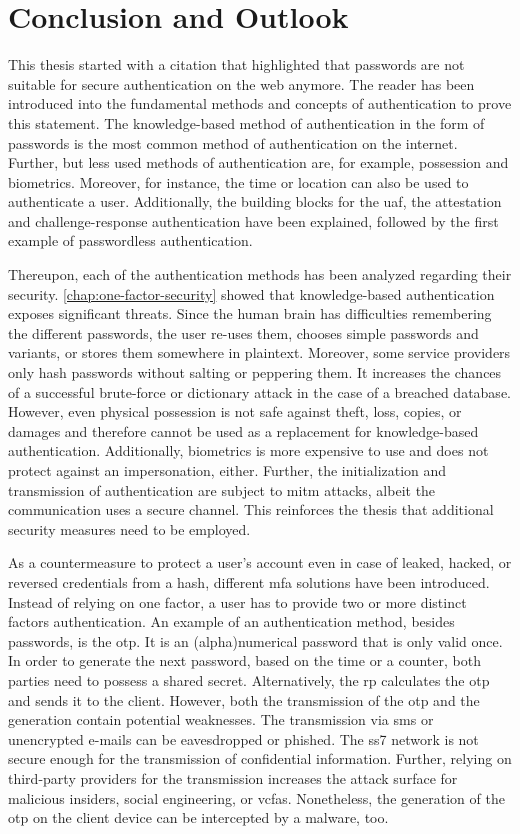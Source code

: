 \chapter{Conclusion and Outlook}

This thesis started with a citation that highlighted that passwords are not suitable for secure authentication on the web anymore. The reader has been introduced into the fundamental methods and concepts of authentication to prove this statement. The knowledge-based method of authentication in the form of passwords is the most common method of authentication on the internet. Further, but less used methods of authentication are, for example, possession and biometrics. Moreover, for instance, the time or location can also be used to authenticate a user. Additionally, the building blocks for the \gls{uaf}, the attestation and challenge-response authentication have been explained, followed by the first example of passwordless authentication.

Thereupon, each of the authentication methods has been analyzed regarding their security. \autoref{chap:one-factor-security} showed that knowledge-based authentication exposes significant threats. Since the human brain has difficulties remembering the different passwords, the user re-uses them, chooses simple passwords and variants, or stores them somewhere in plaintext. Moreover, some service providers only hash passwords without salting or peppering them. It increases the chances of a successful brute-force or dictionary attack in the case of a breached database. However, even physical possession is not safe against theft, loss, copies, or damages and therefore cannot be used as a replacement for knowledge-based authentication. Additionally, biometrics is more expensive to use and does not protect against an impersonation, either. Further, the initialization and transmission of authentication are subject to \gls{mitm} attacks, albeit the communication uses a secure channel. This reinforces the thesis that additional security measures need to be employed.

As a countermeasure to protect a user's account even in case of leaked, hacked, or reversed credentials from a hash, different \gls{mfa} solutions have been introduced. Instead of relying on one factor, a user has to provide two or more distinct factors authentication. An example of an authentication method, besides passwords, is the \gls{otp}. It is an (alpha)numerical password that is only valid once. In order to generate the next password, based on the time or a counter, both parties need to possess a shared secret. Alternatively, the \gls{rp} calculates the \gls{otp} and sends it to the client. However, both the transmission of the \gls{otp} and the generation contain potential weaknesses. The transmission via \gls{sms} or unencrypted e-mails can be eavesdropped or phished. The \gls{ss7} network is not secure enough for the transmission of confidential information. Further, relying on third-party providers for the transmission increases the attack surface for malicious insiders, social engineering, or \glspl{vcfa}. Nonetheless, the generation of the \gls{otp} on the client device can be intercepted by a malware, too.

